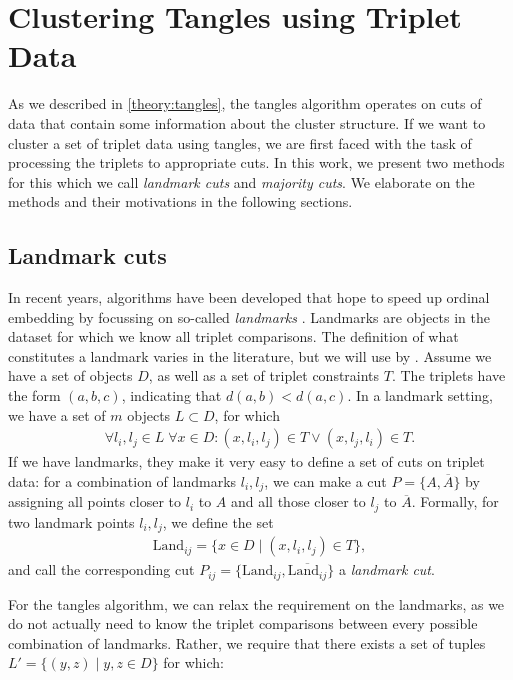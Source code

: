 \chapter{Clustering Tangles using Triplet Data}\label{methods}
As we described in \autoref{theory:tangles}, the tangles algorithm operates on cuts of data that contain some information about the cluster structure.
If we want to cluster a set of triplet data using tangles, we are first faced with the task of processing the triplets to appropriate cuts. In this work, we present two 
methods for this which we call \textit{landmark cuts} and \textit{majority cuts}. We elaborate on the methods and their motivations in the following sections.

\section{Landmark cuts}\label{theory:landmark_cuts}
In recent years, algorithms have been developed that hope to speed up ordinal embedding by focussing on so-called \textit{landmarks} \citep{ghoshLandmarkOrdinalEmbedding2019, andertonScalingOrdinalEmbedding2019}. Landmarks are objects in the dataset for which we know all triplet comparisons.  
The definition of what constitutes a landmark varies in the literature, but we will use by \cite{haghiriComparisonBasedFrameworkPsychophysics2019}.
Assume we have a set of objects $D$, as well as a set of triplet constraints $T$. The triplets 
have the form $(a,b,c)$, indicating that $d(a,b) < d(a,c)$. In a landmark setting, we have a set 
of $m$ objects $L \subset D$, for which 
\begin{align*}
\forall l_i, l_j \in L \; \forall x \in D: (x, l_i, l_j) \in T \vee (x, l_j, l_i) \in T. 
\end{align*}
If we have landmarks, they make it very easy to define a set of cuts on triplet data:
for a combination of landmarks $l_i, l_j$, we can make a cut $P = \{A, \overline{A}\}$ by assigning all points closer to $l_i$ to $A$ and all those closer to $l_j$ to $\overline{A}$. 
Formally, for two landmark points $l_i, l_j$, we define the set
\begin{align*}
    \text{Land} _{ij} = \{ x \in D \mid \left( x, l_i, l_j \right) \in T \}
,\end{align*}
and call the corresponding cut $P_{ij} = \{\text{Land}_{ij}, \overline{\text{Land}_{ij}}\}$ a \textit{landmark cut}.

For the tangles algorithm, we can relax the requirement on the landmarks, as we do not actually
need to know the triplet comparisons between every possible combination of landmarks. Rather, 
we require that there exists a set of tuples $L' = \{ (y, z)  \mid y, z \in D \}$ for which:

